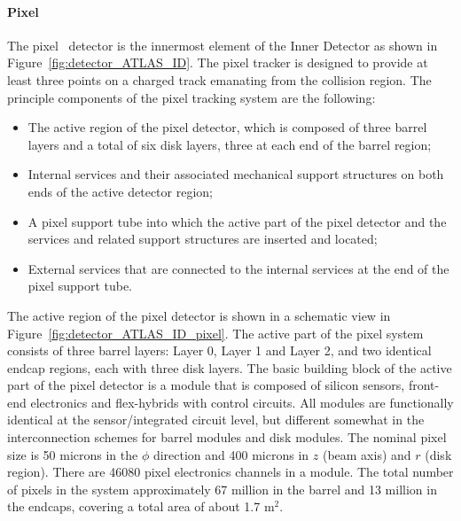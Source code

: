 \paragraph{Pixel}

The pixel~\cite{Aad:2008zz} detector is the innermost element of the Inner Detector as shown in Figure~\ref{fig:detector_ATLAS_ID}. The pixel tracker is designed to provide at least three points on a charged track emanating from the collision region. The principle components of the pixel tracking system are the following:
\begin{itemize}
\item The active region of the pixel detector, which is composed of three barrel layers and a total of six disk layers, three at each end of the barrel region;
\item Internal services and their associated mechanical support structures on both ends of the active detector region;
\item A pixel support tube into which the active part of the pixel detector and the services and related support structures are inserted and located;
\item External services that are connected to the internal services at the end of the pixel support tube.
\end{itemize}

The active region of the pixel detector is shown in a schematic view in Figure~\ref{fig:detector_ATLAS_ID_pixel}. The active part of the pixel system consists of three barrel layers: Layer 0, Layer 1 and Layer 2, and two identical endcap regions, each with three disk layers. The basic building block of the active part of the pixel detector is a module that is composed of silicon sensors, front-end electronics and flex-hybrids with control circuits. All modules are functionally identical at the sensor/integrated circuit level, but different somewhat in the interconnection schemes for barrel modules and disk modules. The nominal pixel size is 50 microns in the $\phi$ direction and 400 microns in $z$ (beam axis) and $r$ (disk region). There are 46080 pixel electronics channels in a module. The total number of pixels in the system approximately 67 million in the barrel and 13 million in the endcaps, covering a total area of about 1.7 $\text{m}^2$.

